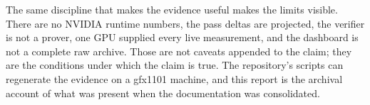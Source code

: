 The same discipline that makes the evidence useful makes the limits visible.
There are no NVIDIA runtime numbers, the pass deltas are projected, the
verifier is not a prover, one GPU supplied every live measurement, and the
dashboard is not a complete raw archive. Those are not caveats appended to the
claim; they are the conditions under which the claim is true. The repository's
scripts can regenerate the evidence on a gfx1101 machine, and this report is
the archival account of what was present when the documentation was
consolidated.

